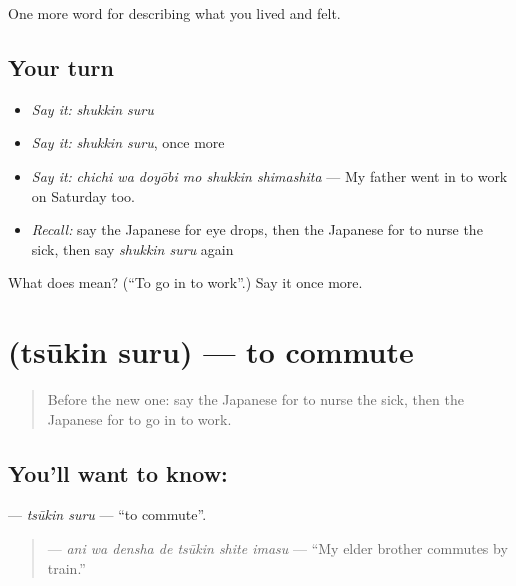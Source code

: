 \begin{grammarlens}[title={What you've built}]
One more word for describing what you lived and felt.
\end{grammarlens}

\subsection*{Your turn}
\begin{itemize}
\raggedright
  \item \emph{Say it:} \emph{shukkin suru}
  \item \emph{Say it:} \emph{shukkin suru}, once more
  \item \emph{Say it:} \emph{chichi wa doyōbi mo shukkin shimashita} — My father went in to work on Saturday too.
  \item \emph{Recall:} say the Japanese for eye drops, then the Japanese for to nurse the sick, then say \emph{shukkin suru} again
\end{itemize}

\begin{tcolorbox}[breakable,colback=teal!4,colframe=teal!35!black,title={Before you move on}]
What does  mean? (\textquotedblleft{}To go in to work\textquotedblright{}.) Say it once more.
\end{tcolorbox}
\section[\texorpdfstring{\ja{つうきんする} (tsūkin suru)}{つうきんする (tsūkin suru)}]{ (tsūkin suru) — to commute}

\label{lesson:JA-C451-tsuukin-suru}



\begin{quote}
Before the new one: say the Japanese for to nurse the sick, then the Japanese for to go in to work.
\end{quote}

\subsection*{You'll want to know: }
\textbf{} — \emph{tsūkin suru} — \textquotedblleft{}to commute\textquotedblright{}.

\begin{quote}
\textbf{  } — \emph{ani wa densha de tsūkin shite imasu} — \textquotedblleft{}My elder brother commutes by train.\textquotedblright{}
\end{quote}

